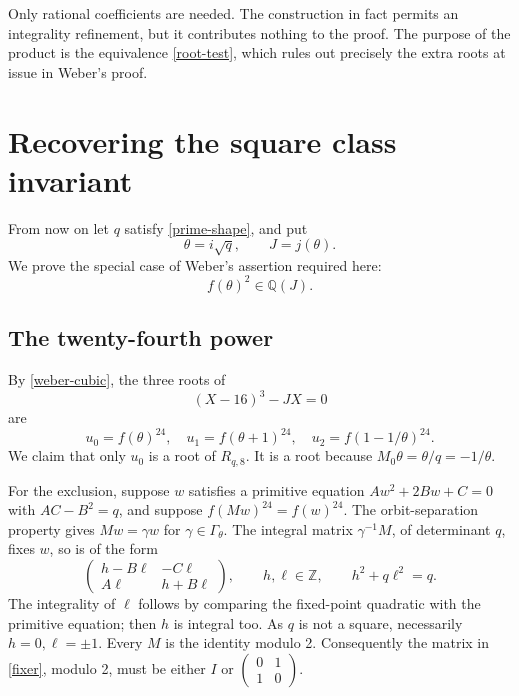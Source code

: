 \documentclass[11pt]{article}
\newcommand{\Z}{\mathbb Z}
\newcommand{\Q}{\mathbb Q}
\newcommand{\G}{\Gamma_\theta}
\begin{document}
Only rational coefficients are needed. The construction in fact permits
an integrality refinement, but it contributes nothing to the proof.
The purpose of the product is the equivalence \eqref{root-test},
which rules out precisely the extra roots at issue in Weber's proof.

\section{Recovering the square class invariant}\label{square-invariant}

From now on let \(q\) satisfy \eqref{prime-shape}, and put
\[
 \theta=i\sqrt q,\qquad J=j(\theta).
\]
We prove the special case of Weber's assertion required here:
\begin{equation}\label{f2-invariant}
 f(\theta)^2\in\Q(J).
\end{equation}

\subsection{The twenty-fourth power}

By \eqref{weber-cubic}, the three roots of
\begin{equation}\label{U-cubic}
 (X-16)^3-JX=0
\end{equation}
are
\[
 u_0=f(\theta)^{24},\quad
 u_1=f(\theta+1)^{24},\quad
 u_2=f(1-1/\theta)^{24}.
\]
We claim that only \(u_0\) is a root of \(R_{q,8}\).
It is a root because \(M_0\theta=\theta/q=-1/\theta\).

For the exclusion, suppose \(w\) satisfies a primitive equation
\(Aw^2+2Bw+C=0\) with \(AC-B^2=q\), and suppose
\(f(Mw)^{24}=f(w)^{24}\). The orbit-separation property gives
\(Mw=\gamma w\) for \(\gamma\in\G\). The integral matrix
\(\gamma^{-1}M\), of determinant \(q\), fixes \(w\), so is
of the form
\begin{equation}\label{fixer}
 \begin{pmatrix}h-B\ell&-C\ell\\A\ell&h+B\ell\end{pmatrix},
 \qquad h,\ell\in\Z,\qquad h^2+q\ell^2=q.
\end{equation}
The integrality of \(\ell\) follows by comparing the fixed-point
quadratic with the primitive equation; then \(h\) is integral too.
As \(q\) is not a square, necessarily \(h=0,\ell=\pm1\).
Every \(M\) is the identity modulo 2. Consequently the matrix in
\eqref{fixer}, modulo 2, must be either \(I\) or
\(\left(\begin{smallmatrix}0&1\\1&0\end{smallmatrix}\right)\).
\end{document}
